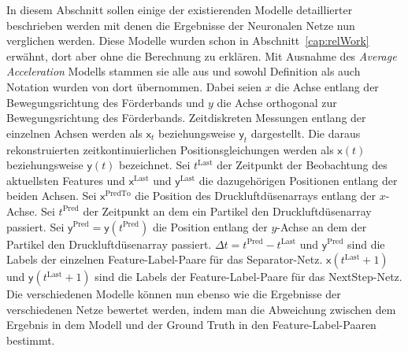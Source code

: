 
In diesem Abschnitt sollen einige der existierenden Modelle detaillierter beschrieben werden mit denen die Ergebnisse der Neuronalen Netze nun verglichen werden.
Diese Modelle wurden schon in Abschnitt~\ref{cap:relWork} erwähnt, dort aber ohne die Berechnung zu erklären.
Mit Ausnahme des \textit{Average Acceleration} Modells stammen sie alle aus \cite{Pfaff2018} und sowohl Definition als auch Notation wurden von dort übernommen.
Dabei seien \(x\) die Achse entlang der Bewegungsrichtung des Förderbands und \(y\) die Achse orthogonal zur Bewegungsrichtung des Förderbands.
Zeitdiskreten Messungen entlang der einzelnen Achsen werden als \(\mathsf{x}_t\) beziehungsweise \(\mathsf{y}_t\) dargestellt.
Die daraus rekonstruierten zeitkontinuierlichen Positionsgleichungen werden als \(\mathsf{x}(t)\) beziehungsweise \(\mathsf{y}(t)\) bezeichnet.
Sei \(t^{\text{Last}}\) der Zeitpunkt der Beobachtung des aktuellsten Features und \(\mathsf{x}^{\text{Last}}\) und \(\mathsf{y}^{\text{Last}}\) die dazugehörigen Positionen entlang der beiden Achsen.
Sei \(\mathsf{x}^{\text{PredTo}}\) die Position des Druckluftdüsenarrays entlang der \(x\)-Achse.
Sei \(t^{\text{Pred}}\) der Zeitpunkt an dem ein Partikel den Druckluftdüsenarray passiert.
Sei \(\mathsf{y}^{\text{Pred}} = \mathsf{y}(t^{\text{Pred}})\) die Position entlang der \(y\)-Achse an dem der Partikel den Druckluftdüsenarray passiert.
\(\Delta t = t^{\text{Pred}} - t^{\text{Last}} \) und \(\mathsf{y}^{\text{Pred}}\) sind die Labels der einzelnen Feature-Label-Paare für das Separator-Netz.
\(\mathsf{x}(t^{\text{Last}} + 1)\) und \(\mathsf{y}(t^{\text{Last}} + 1)\) sind die Labels der Feature-Label-Paare für das NextStep-Netz.
Die verschiedenen Modelle können nun ebenso wie die Ergebnisse der verschiedenen Netze bewertet werden, 
indem man die Abweichung zwischen dem Ergebnis in dem Modell und der Ground Truth in den Feature-Label-Paaren bestimmt.


